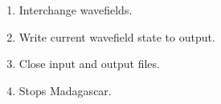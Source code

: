 \begin{enumerate}
\item Interchange wavefields.
\tiny

\normalsize

\item Write current wavefield state to output.
\tiny

\normalsize

\item Close input and output files.
\tiny

\normalsize

\item Stops Madagascar.
\tiny

\normalsize	

\end{enumerate}

